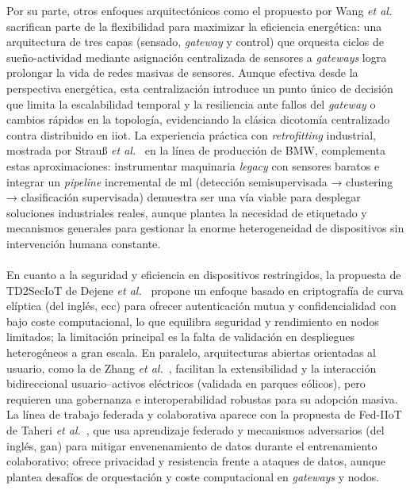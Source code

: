 Por su parte, otros enfoques arquitectónicos como el propuesto por Wang \textit{et al.}~\cite{wang2016green} sacrifican parte de la flexibilidad para maximizar la eficiencia energética: una arquitectura de tres capas (sensado, \textit{gateway} y control) que orquesta ciclos de sueño-actividad mediante asignación centralizada de sensores a \textit{gateways} logra prolongar la vida de redes masivas de sensores. Aunque efectiva desde la perspectiva energética, esta centralización introduce un punto único de decisión que limita la escalabilidad temporal y la resiliencia ante fallos del \textit{gateway} o cambios rápidos en la topología, evidenciando la clásica dicotomía centralizado contra distribuido en \gls{iiot}. La experiencia práctica con \textit{retrofitting} industrial, mostrada por Strauß \textit{et al.}~\cite{strauss2018enabling} en la línea de producción de BMW, complementa estas aproximaciones: instrumentar maquinaria \textit{legacy} con sensores baratos e integrar un \textit{pipeline} incremental de \gls{ml} (detección semisupervisada → clustering → clasificación supervisada) demuestra ser una vía viable para desplegar soluciones industriales reales, aunque plantea la necesidad de etiquetado y mecanismos generales para gestionar la enorme heterogeneidad de dispositivos sin intervención humana constante.\\
\\
En cuanto a la seguridad y eficiencia en dispositivos restringidos, la propuesta de TD2SecIoT de Dejene \textit{et al.}~\cite{dejene2020td2seciot} propone un enfoque basado en criptografía de curva elíptica (del inglés, \gls{ecc}) para ofrecer autenticación mutua y confidencialidad con bajo coste computacional, lo que equilibra seguridad y rendimiento en nodos limitados; la limitación principal es la falta de validación en despliegues heterogéneos a gran escala. En paralelo, arquitecturas abiertas orientadas al usuario, como la de Zhang \textit{et al.}~\cite{zhang2020open}, facilitan la extensibilidad y la interacción bidireccional usuario–activos eléctricos (validada en parques eólicos), pero requieren una gobernanza e interoperabilidad robustas para su adopción masiva. La línea de trabajo federada y colaborativa aparece con la propuesta de Fed-IIoT de Taheri \textit{et al.}~\cite{taheri2020fed}, que usa aprendizaje federado y mecanismos adversarios (del inglés, \gls{gan}) para mitigar envenenamiento de datos durante el entrenamiento colaborativo; ofrece privacidad y resistencia frente a ataques de datos, aunque plantea desafíos de orquestación y coste computacional en \textit{gateways} y nodos.\\
